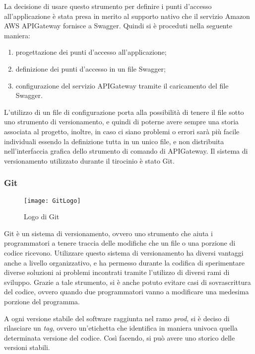 La decisione di usare questo strumento per definire i punti d'accesso
all'applicazione è stata presa in merito al supporto nativo che il servizio
Amazon AWS APIGateway fornisce a Swagger. Quindi si è proceduti nella seguente
maniera:
\begin{enumerate}
  \item progettazione dei punti d'accesso all'applicazione;
  \item definizione dei punti d'accesso in un file Swagger;
  \item configurazione del servizio APIGateway tramite il caricamento del file
Swagger.
\end{enumerate}


L'utilizzo di un file di configurazione porta alla possibilità di
tenere il file sotto uno strumento di versionamento, e quindi di poterne avere
sempre una storia associata al progetto, inoltre, in caso ci siano problemi o
errori sarà più facile individuali essendo la definizione tutta in un unico
file, e non distribuita nell'interfaccia grafica dello strumento di comando di
APIGateway.
Il sistema di versionamento utilizzato durante il tirocinio è stato Git.


\subsubsection{Git}
\begin{figure}[H]
  \centering
  \texttt{[image: GitLogo]}
  \caption{Logo di Git}
\end{figure}
Git è un sistema di versionamento, ovvero uno strumento che aiuta i
programmatori a tenere traccia delle modifiche che un file o una porzione di
codice ricevono. Utilizzare questo sistema di versionamento ha diversi vantaggi
anche a livello organizzativo, e ha permesso durante la codifica di
sperimentare diverse soluzioni ai problemi incontrati tramite l'utilizzo di
diversi rami di sviluppo. Grazie a tale strumento, si è anche potuto evitare
casi di sovrascrittura del codice, ovvero quando due programmatori vanno a
modificare una medesima porzione del programma.

A ogni versione stabile del software raggiunta nel ramo \textit{prod}, si è
deciso di rilasciare un \textit{tag}, ovvero un'etichetta che identifica in
maniera univoca quella determinata versione del codice. Così facendo, si può
avere uno storico delle versioni stabili.

